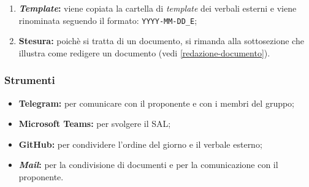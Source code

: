 \begin{itemize}
\begin{enumerate}
		      \item \textbf{\textit{Template}:} viene copiata la cartella di \textit{template} dei
		            verbali esterni e viene rinominata seguendo il formato:
		            \texttt{YYYY-MM-DD\_E};

		      \item \textbf{Stesura:} poichè si tratta di un documento, si
		            rimanda alla sottosezione che illustra come redigere un
		            documento (vedi \cref{redazione-documento}).
	      \end{enumerate}
\end{itemize}

\subsubsection{Strumenti}
\begin{itemize}
	\item \textbf{Telegram\g:} per comunicare con il proponente e con i membri del
	      gruppo;

	\item \textbf{Microsoft Teams:} per svolgere il SAL\g;

	\item \textbf{GitHub\g:} per condividere l'ordine del giorno e il verbale
	      esterno;

	\item \textbf{\textit{Mail}:} per la condivisione di documenti e per la
	      comunicazione con il proponente.
\end{itemize}

